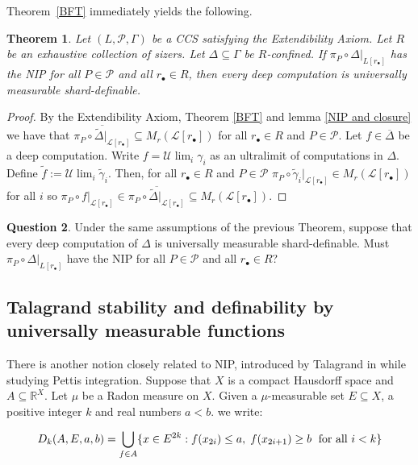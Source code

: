 \documentclass[psamsfonts]{amsart}
\newtheorem{thm}{Theorem}[section]
\theoremstyle{definition}
\newtheorem{question}[thm]{Question}
\theoremstyle{remark}
\numberwithin{equation}{section}
\begin{document}
Theorem~\ref{BFT} immediately yields the following.

\begin{thm}
    Let $(L,\mathcal P,\Gamma)$ be a CCS satisfying the Extendibility Axiom. Let $R$ be an exhaustive collection of sizers. Let $\Delta\subseteq\Gamma$ be $R$-confined. If $\pi_P\circ\Delta|_{L[r_\bullet]}$ has the NIP for all $P\in\mathcal{P}$ and all $r_{\bullet}\in R$, then every deep computation is universally measurable shard-definable.
\end{thm}

\begin{proof}
    By the Extendibility Axiom, Theorem \ref{BFT} and lemma \ref{NIP and closure} we have that $\overline{\pi_P\circ\tilde\Delta|_{\mathcal{L}[r_\bullet]}}\subseteq M_r(\mathcal{L}[r_\bullet])$ for all $r_\bullet\in R$ and $P\in\mathcal{P}$. Let $f\in\overline{\Delta}$ be a deep computation. Write $f=\mathcal{U}\lim_i\gamma_i$ as an ultralimit of computations in $\Delta$. Define $\tilde f:=\mathcal{U}\lim_i\tilde\gamma_i$. Then, for all $r_\bullet\in R$ and $P\in\mathcal{P}$ $\pi_P \circ \tilde\gamma_i|_{\mathcal{L}[r_\bullet]}\in M_r(\mathcal{L}[r_\bullet])$ for all $i$ so $\pi_P \circ f|_{\mathcal{L}[r_\bullet]}\in \overline{\pi_P\circ\tilde\Delta|_{\mathcal{L}[r_\bullet]}}\subseteq M_r(\mathcal{L}[r_\bullet])$.
\end{proof}

\begin{question}
Under the same assumptions of the previous Theorem, suppose that every deep computation of $\Delta$ is universally measurable shard-definable. Must $\pi_P\circ\Delta|_{L[r_\bullet]}$ have the NIP for all $P\in\mathcal{P}$ and all $r_{\bullet}\in R$?
\end{question}

\subsection{Talagrand stability and definability by universally measurable functions}

There is another notion closely related to NIP, introduced by Talagrand in \cite{talagrand1984pettis} while studying Pettis integration. Suppose that $X$ is a compact Hausdorff space and $A\subseteq \mathbb{R}^X$. Let $\mu$ be a Radon measure on $X$. Given a $\mu$-measurable set $E\subseteq X$, a positive integer $k$ and real numbers $a<b$. we write:

$$D_k(A,E,a,b)=\bigcup_{f\in A}\{x\in E^{2k}:f(x_{2i})\leq a, \hspace{1mm} f(x_{2i+1})\geq b \hspace{1mm}{\text{ for all }i<k} \}$$
\end{document}

